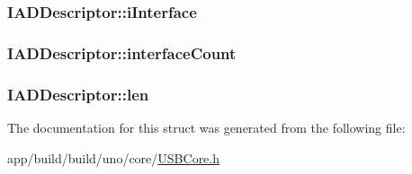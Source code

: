 \hypertarget{struct_i_a_d_descriptor_a5214f994021a633bb19540e0d21efb14}{
\subsubsection[{i\-Interface}]{ I\-A\-D\-Descriptor\-::i\-Interface}}\label{struct_i_a_d_descriptor_a5214f994021a633bb19540e0d21efb14}
\hypertarget{struct_i_a_d_descriptor_ac2022cc2233dcc739446009ab826f8db}{
\subsubsection[{interface\-Count}]{ I\-A\-D\-Descriptor\-::interface\-Count}}\label{struct_i_a_d_descriptor_ac2022cc2233dcc739446009ab826f8db}
\hypertarget{struct_i_a_d_descriptor_ae2d1b72e4763579aae06e0317a24af12}{
\subsubsection[{len}]{ I\-A\-D\-Descriptor\-::len}}\label{struct_i_a_d_descriptor_ae2d1b72e4763579aae06e0317a24af12}


The documentation for this struct was generated from the following file\-:\begin{DoxyCompactItemize}
\item 
app/build/build/uno/core/\hyperlink{_u_s_b_core_8h}{U\-S\-B\-Core.\-h}\end{DoxyCompactItemize}
